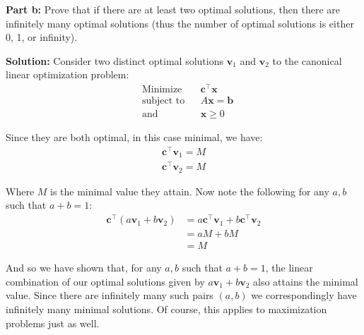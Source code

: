 \documentclass{article}
\renewcommand\vec{\mathbf}
\begin{document}
\noindent\textbf{Part b:} Prove that if there are at least two optimal solutions, then there are infinitely many optimal solutions (thus the number of optimal solutions is either 0, 1, or infinity).
\bigskip

\noindent\textbf{Solution:} Consider two distinct optimal solutions $\vec v_1$ and $\vec v_2$ to the canonical linear optimization problem:
$$\begin{aligned}
    &{\text{Minimize}}
    &&\vec c^\top\vec x\\
    &{\text{subject to}}
    &&A\vec x=\vec b\\
    &{\text{and}}
    &&\vec x\ge 0
\end{aligned}$$

Since they are both optimal, in this case minimal, we have:
\begin{gather*}
    \vec c^\top\vec v_1=M\\
    \vec c^\top\vec v_2=M
\end{gather*}

Where $M$ is the minimal value they attain. Now note the following for any $a,b$ such that $a+b=1$:
\begin{align*}
    \vec c^\top(a\vec v_1+b\vec v_2)&=a\vec c^\top\vec v_1+b\vec c^\top\vec v_2\tag{objective}\\
    &=aM+bM\tag{def. of $M$}\\
    &=M\tag{$a+b=1$, i.e. convex combination}
\end{align*}

And so we have shown that, for any $a,b$ such that $a+b=1$, the linear combination of our optimal solutions given by $a\vec v_1+b\vec v_2$ also attains the minimal value. Since there are infinitely many such pairs $(a,b)$ we correspondingly have infinitely many minimal solutions. Of course, this applies to maximization problems just as well.
\end{document}
